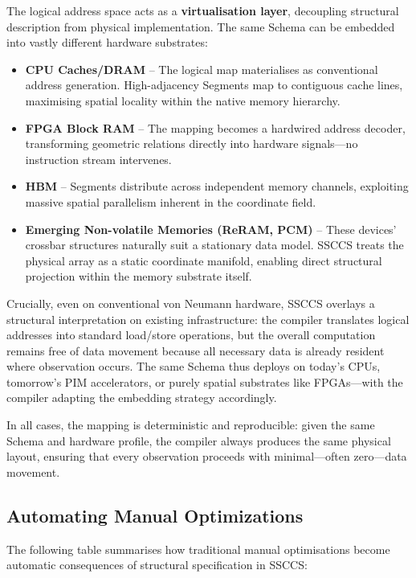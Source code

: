 \documentclass[
  a4paper,
  DIV=11,
  numbers=noendperiod]{scrartcl}
\providecommand{\tightlist}{%
  \setlength{\itemsep}{0pt}\setlength{\parskip}{0pt}}
\begin{document}
The logical address space acts as a \textbf{virtualisation layer},
decoupling structural description from physical implementation. The same
Schema can be embedded into vastly different hardware substrates:

\begin{itemize}
\tightlist
\item
  \textbf{CPU Caches/DRAM} -- The logical map materialises as
  conventional address generation. High-adjacency Segments map to
  contiguous cache lines, maximising spatial locality within the native
  memory hierarchy.
\item
  \textbf{FPGA Block RAM} -- The mapping becomes a hardwired address
  decoder, transforming geometric relations directly into hardware
  signals---no instruction stream intervenes.
\item
  \textbf{HBM} -- Segments distribute across independent memory
  channels, exploiting massive spatial parallelism inherent in the
  coordinate field.
\item
  \textbf{Emerging Non-volatile Memories (ReRAM, PCM)} -- These devices'
  crossbar structures naturally suit a stationary data model. SSCCS
  treats the physical array as a static coordinate manifold, enabling
  direct structural projection within the memory substrate itself.
\end{itemize}

Crucially, even on conventional von Neumann hardware, SSCCS overlays a
structural interpretation on existing infrastructure: the compiler
translates logical addresses into standard load/store operations, but
the overall computation remains free of data movement because all
necessary data is already resident where observation occurs. The same
Schema thus deploys on today's CPUs, tomorrow's PIM accelerators, or
purely spatial substrates like FPGAs---with the compiler adapting the
embedding strategy accordingly.

In all cases, the mapping is deterministic and reproducible: given the
same Schema and hardware profile, the compiler always produces the same
physical layout, ensuring that every observation proceeds with
minimal---often zero---data movement.

\subsection{Automating Manual
Optimizations}\label{automating-manual-optimizations}

The following table summarises how traditional manual optimisations
become automatic consequences of structural specification in SSCCS:
\end{document}
